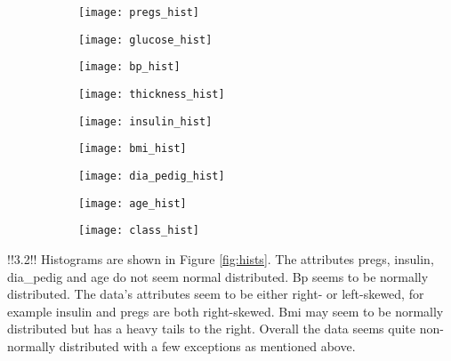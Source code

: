 \begin{figure}
  \centering{}
  \caption{Histograms of attributes}\label{fig:hists}
  \begin{subfigure}{0.3\textwidth}
    \texttt{[image: pregs\_hist]}
  \end{subfigure}
  \begin{subfigure}{0.3\textwidth}
    \texttt{[image: glucose\_hist]}
  \end{subfigure}
  \begin{subfigure}{0.3\textwidth}
    \texttt{[image: bp\_hist]}
  \end{subfigure}

  \begin{subfigure}{0.3\textwidth}
    \texttt{[image: thickness\_hist]}
  \end{subfigure}
  \begin{subfigure}{0.3\textwidth}
    \texttt{[image: insulin\_hist]}
  \end{subfigure}
  \begin{subfigure}{0.3\textwidth}
    \texttt{[image: bmi\_hist]}
  \end{subfigure}

  \begin{subfigure}{0.3\textwidth}
    \texttt{[image: dia\_pedig\_hist]}
  \end{subfigure}
  \begin{subfigure}{0.3\textwidth}
    \texttt{[image: age\_hist]}
  \end{subfigure}
  \begin{subfigure}{0.3\textwidth}
    \texttt{[image: class\_hist]}
  \end{subfigure}
\end{figure}

!!3.2!!
Histograms are shown in Figure \ref{fig:hists}. The attributes pregs, insulin, dia\_pedig
and age do not seem normal distributed. Bp seems to be normally distributed.
The data's attributes seem to be either right- or left-skewed, for example insulin and pregs
are both right-skewed. Bmi may seem to be normally distributed but has a
heavy tails to the right.
Overall the data seems quite non-normally distributed with a few exceptions as mentioned above.

